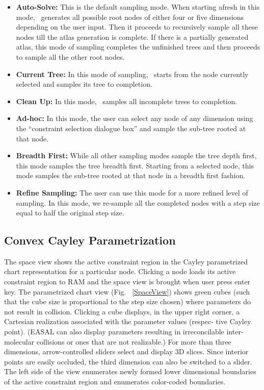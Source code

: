 \documentclass[10pt]{article}
\begin{document}
\begin{itemize}
\item \textbf{Auto-Solve:} This is the default sampling mode. When starting
		afresh in this mode, \EASAL~generates all possible root nodes of
		either four or five dimensions depending on the user input. Then it
		proceeds to recursively sample all these nodes till the atlas generation
		is complete. If there is a partially generated atlas, this mode of
		sampling completes	 the unfinished trees and then proceeds to sample
		all the other root nodes.
\item \textbf{Current Tree:} In this mode of sampling, \EASAL~starts from the
		node currently selected and samples its tree to completion.
\item \textbf{Clean Up:} In this mode, \EASAL~samples all incomplete trees to
		completion.
\item \textbf{Ad-hoc:} In this mode, the user can select any node of any
		dimension using the ``constraint selection dialogue box'' and sample
		the sub-tree rooted at that node.
\item \textbf{Breadth First:} While all other sampling modes sample the tree
		depth first, this mode samples the tree breadth first. Starting from a
		selected node, this mode samples the sub-tree rooted at that node in a
		breadth first fashion.
\item \textbf{Refine Sampling:} The user can use this mode for a more refined
		level of sampling. In this mode, we re-sample all the completed nodes
		with a step size equal to half the original step size.
\end{itemize}



\subsection{Convex Cayley Parametrization}

The space view shows the active constraint region in the Cayley parametrized
chart representation for a particular node.  Clicking a node loads its active
constraint region to RAM and the space view is brought when user press enter
key. The parametrized chart view (Fig. ~\ref{SpaceView}) shows green cubes (such
that the cube size is proportional to the step size chosen) where parameters do
not result in collision. Clicking a cube displays, in the upper right corner, a
Cartesian realization associated with the parameter values (respec- tive Cayley
point). (EASAL can also display parameters resulting in irreconcilable inter-
molecular collisions or ones that are not realizable.) For more than three
dimensions, arrow-controlled sliders select and display 3D slices. Since
interior points are easily occluded, the third dimension can also be switched
to a slider. The left side of the view enumerates newly formed lower
dimensional boundaries of the active constraint region and enumerates
color-coded boundaries.
\end{document}
